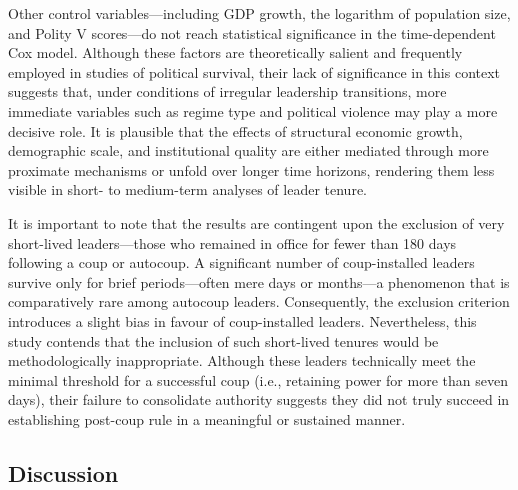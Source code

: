 \documentclass[
  12pt,
]{report}
\begin{document}
Other control variables---including GDP growth, the logarithm of
population size, and Polity V scores---do not reach statistical
significance in the time-dependent Cox model. Although these factors are
theoretically salient and frequently employed in studies of political
survival, their lack of significance in this context suggests that,
under conditions of irregular leadership transitions, more immediate
variables such as regime type and political violence may play a more
decisive role. It is plausible that the effects of structural economic
growth, demographic scale, and institutional quality are either mediated
through more proximate mechanisms or unfold over longer time horizons,
rendering them less visible in short- to medium-term analyses of leader
tenure.

It is important to note that the results are contingent upon the
exclusion of very short-lived leaders---those who remained in office for
fewer than 180 days following a coup or autocoup. A significant number
of coup-installed leaders survive only for brief periods---often mere
days or months---a phenomenon that is comparatively rare among autocoup
leaders. Consequently, the exclusion criterion introduces a slight bias
in favour of coup-installed leaders. Nevertheless, this study contends
that the inclusion of such short-lived tenures would be methodologically
inappropriate. Although these leaders technically meet the minimal
threshold for a successful coup (i.e., retaining power for more than
seven days), their failure to consolidate authority suggests they did
not truly succeed in establishing post-coup rule in a meaningful or
sustained manner.

\subsection{Discussion}\label{discussion}
\end{document}
